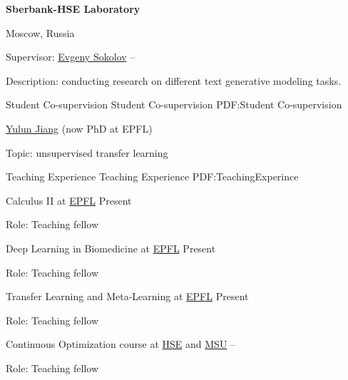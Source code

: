 \documentclass[letterpaper,MMMyyyy,nonstopmode]{simpleresumecv}
\begin{document}
\begin{Body}
\Gap

\Entry
\textbf{Sberbank-HSE Laboratory}
\par
Moscow, Russia

\Gap
\BulletItem
Supervisor: \href{https://www.hse.ru/en/staff/esokolov}{Evgeny Sokolov}
\hfill
{} --
\begin{Detail}
\SubBulletItem
Description: conducting research on different text generative modeling tasks.
\end{Detail}



\Section
{Student Co-supervision}
{Student Co-supervision}
{PDF:Student Co-supervision}

\BulletItem
\href{https://yljblues.github.io}{Yulun Jiang} (now PhD at EPFL)
\begin{Detail}
\SubBulletItem
Topic: unsupervised transfer learning
\end{Detail}




\Section
{Teaching Experience}
{Teaching Experience}
{PDF:TeachingExperince}

\BulletItem
Calculus II at \href{https://edu.epfl.ch/coursebook/en/analysis-ii-MATH-106-E}{EPFL}
\hfill
Present
\begin{Detail}
\Item
Role: Teaching fellow
\end{Detail}

\BulletItem
Deep Learning in Biomedicine at \href{https://edu.epfl.ch/coursebook/en/deep-learning-in-biomedicine-CS-502}{EPFL}
\hfill
Present
\begin{Detail}
\Item
Role: Teaching fellow
\end{Detail}

\BulletItem
Transfer Learning and Meta-Learning at \href{https://edu.epfl.ch/coursebook/en/transfer-learning-and-meta-learning-CS-625}{EPFL}
\hfill
Present
\begin{Detail}
\Item
Role: Teaching fellow
\end{Detail}

\BulletItem
Continuous Optimization course at \href{https://cs.hse.ru/en/}{HSE} and \href{https://cs.msu.ru/en}{MSU}
\hfill
{} --
\begin{Detail}
\Item
Role: Teaching fellow
\end{Detail}


\end{Body}
\end{document}
